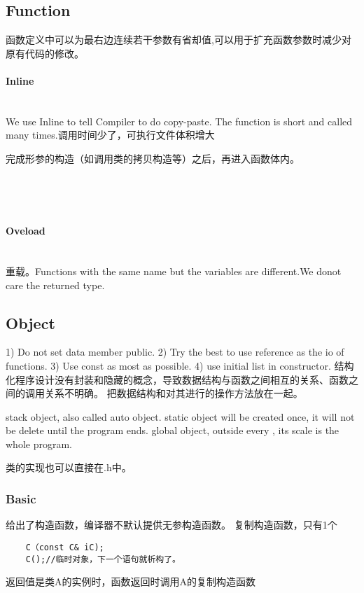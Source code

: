\documentclass[UTF8]{../computerUniverse}
\begin{document}
\subsection{Function}
函数定义中可以为最右边连续若干参数有省却值,可以用于扩充函数参数时减少对原有代码的修改。
\paragraph{Inline} \quad\\
We use Inline to tell Compiler to do copy-paste. The function is short and called many times.调用时间少了，可执行文件体积增大

完成形参的构造（如调用类的拷贝构造等）之后，再进入函数体内。
\begin{lstlisting}


    
\end{lstlisting}
\paragraph{Oveload} \quad\\
重载。Functions with the same name but the variables are different.We donot care the returned type.




\subsection{Object}

1) Do not set data member public.
2) Try the best to use reference as the io of functions.
3) Use const as most as possible.
4) use initial list in constructor.
结构化程序设计没有封装和隐藏的概念，导致数据结构与函数之间相互的关系、函数之间的调用关系不明确。
把数据结构和对其进行的操作方法放在一起。

stack object, also called auto object. 
static object will be created once, it will not be delete until the program ends.
global object, outside every {}, its scale is the whole program.

类的实现也可以直接在.h中。
\subsubsection{Basic}
给出了构造函数，编译器不默认提供无参构造函数。
复制构造函数，只有1个
\begin{lstlisting}
    C（const C& iC);
    C();//临时对象，下一个语句就析构了。
\end{lstlisting}
返回值是类A的实例时，函数返回时调用A的复制构造函数
\end{document}
